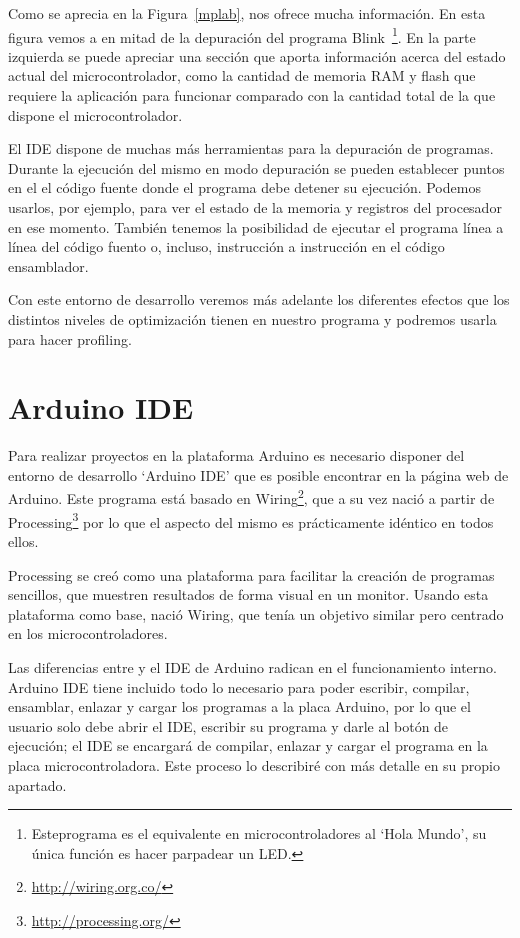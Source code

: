 
Como se aprecia en la Figura~\ref{mplab},  nos ofrece mucha información. En esta figura vemos a  en mitad de la depuración del programa Blink~\footnote{Esteprograma es el equivalente en microcontroladores al `Hola Mundo', su única función es hacer parpadear un LED.}. En la parte izquierda se puede apreciar una sección que aporta información acerca del estado actual del microcontrolador, como la cantidad de memoria RAM y flash que requiere la aplicación para funcionar comparado con la cantidad total de la que dispone el microcontrolador.

El IDE dispone de muchas más herramientas para la depuración de programas. Durante la ejecución del mismo en modo depuración se pueden establecer puntos en el el código fuente donde el programa debe detener su ejecución. Podemos usarlos, por ejemplo, para ver el estado de la memoria y registros del procesador en ese momento. También tenemos la posibilidad de ejecutar el programa línea a línea del código fuento o, incluso, instrucción a instrucción en el código ensamblador.

Con este entorno de desarrollo veremos más adelante los diferentes efectos que los distintos niveles de optimización tienen en nuestro programa y podremos usarla para hacer profiling.

\section{Arduino IDE}
Para realizar proyectos en la plataforma Arduino es necesario disponer del entorno de desarrollo `Arduino IDE' que es posible encontrar en la página web de Arduino. Este programa está basado en Wiring\footnote{\url{http://wiring.org.co/}}, que a su vez nació a partir de Processing\footnote{\url{http://processing.org/}} por lo que el aspecto del mismo es prácticamente idéntico en todos ellos.

Processing se creó como una plataforma para facilitar la creación de programas sencillos, que muestren resultados de forma visual en un monitor. Usando esta plataforma como base, nació Wiring, que tenía un objetivo similar pero centrado en los microcontroladores.

Las diferencias entre  y el IDE de Arduino radican en el funcionamiento interno. Arduino IDE tiene incluido todo lo necesario para poder escribir, compilar, ensamblar, enlazar y cargar los programas a la placa Arduino, por lo que el usuario solo debe abrir el IDE, escribir su programa y darle al botón de ejecución; el IDE se encargará de compilar, enlazar y cargar el programa en la placa microcontroladora. Este proceso lo describiré con más detalle en su propio apartado.

